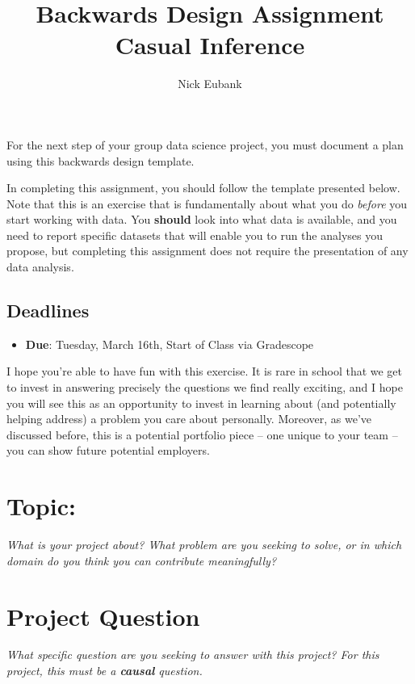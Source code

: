 \documentclass[12pt]{article}
\title{Backwards Design Assignment \\ Casual Inference}
\author{Nick Eubank}
\begin{document}
\maketitle

For the next step of your group data science project, you must document a plan using this backwards design template.

In completing this assignment, you should follow the template presented below. Note that this is an exercise that is fundamentally about what you do \emph{before} you start working with data. You \textbf{should} look into what data is available, and you need to report specific datasets that will enable you to run the analyses you propose, but completing this assignment does not require the presentation of any data analysis.

\subsection*{Deadlines}

\begin{itemize}
  \item \textbf{Due}: Tuesday, March 16th, Start of Class via Gradescope
\end{itemize}

I hope you're able to have fun with this exercise. It is rare in school that we get to invest in answering precisely the questions we find really exciting, and I hope you will see this as an opportunity to invest in learning about (and potentially helping address) a problem you care about personally. Moreover, as we've discussed before, this is a potential portfolio piece -- one unique to your team -- you can show future potential employers.

\section{Topic:}
\emph{What is your project about? What problem are you seeking to solve, or in which domain do you think you can contribute meaningfully?}
\vspace*{1cm}\\

\section{Project Question}
\emph{What specific question are you seeking to answer with this project? For this project, this must be a \textbf{causal} question.}
\vspace*{1cm}\\
\end{document}
